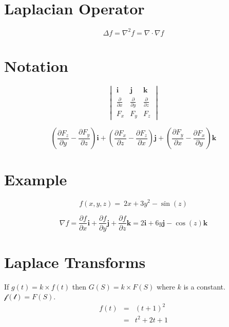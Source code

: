 \documentclass[12pt, a4paper]{article}
\begin{document}
\section{Laplacian Operator}
\[\Delta f = \nabla^2 f = \nabla \cdot \nabla f\]

\section{Notation}
\[ \begin{vmatrix} \mathbf{i} & \mathbf{j} & \mathbf{k} \\
{\frac{\partial}{\partial x}} & {\frac{\partial}{\partial y}} & {\frac{\partial}{\partial z}} \\
 F_x & F_y & F_z \end{vmatrix}\]

\[\left(\frac{\partial F_z}{\partial y}  - \frac{\partial F_y}{\partial z}\right) \mathbf{i} + \left(\frac{\partial F_x}{\partial z} - \frac{\partial F_z}{\partial x}\right) \mathbf{j} + \left(\frac{\partial F_y}{\partial x} - \frac{\partial F_x}{\partial y}\right) \mathbf{k}\]

\section{Example}
\[f(x,y,z)= \ 2x+3y^2-\sin(z)\]

\[ \nabla f=
\frac{\partial f}{\partial x} \mathbf{i} +
\frac{\partial f}{\partial y} \mathbf{j} +
\frac{\partial f}{\partial z} \mathbf{k}
 = 2\mathbf{i}+ 6y\mathbf{j} -\cos(z)\mathbf{k}\]



\section{Laplace Transforms }
If $g(t)=k \times f(t)$ then $G(S) = k \times F(S)$ where $k$ is a
constant. $\mathcal{f(t)}=F(S)$.
\begin{eqnarray}
f(t) &=& (t+1)^2\\
&=& t^2 +2t +1 \nonumber
\end{eqnarray}
\end{document}
